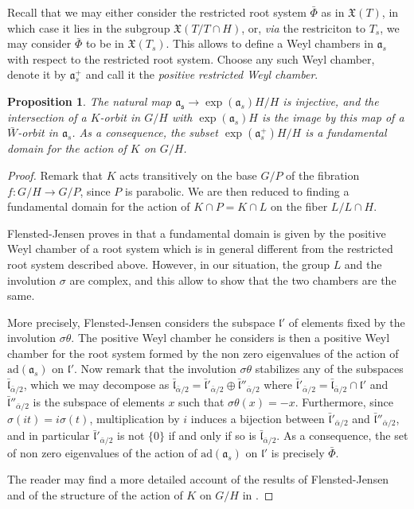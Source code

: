 \documentclass{amsart}
\newtheorem{prop}[thm]{Proposition}
\theoremstyle{definition}
\begin{document}
Recall that we may either consider the restricted root system $\bar{\Phi}$ 
as in $\mathfrak{X}(T)$, in which case it lies in the subgroup 
$\mathfrak{X}(T/T\cap H)$, or, \emph{via} the restriciton to $T_s$, 
we may consider $\bar{\Phi}$ to be in $\mathfrak{X}(T_s)$.
This allows to define a Weyl chambers in $\mathfrak{a}_s$ 
with respect to the restricted root system. Choose any such Weyl 
chamber, denote it by $\mathfrak{a}_s^+$ and call it the 
\emph{positive restricted Weyl chamber}.

\begin{prop}
\label{prop_fundamental_domain}
The natural map $\mathfrak{a_s} \rightarrow \exp(\mathfrak{a}_s)H/H$
is injective, and the intersection of a $K$-orbit 
in $G/H$ with $\exp(\mathfrak{a}_s)H$ is the image by this map of 
a $\bar{W}$-orbit in $\mathfrak{a}_s$. 
As a consequence, the subset $\exp(\mathfrak{a}_s^+)H/H$ is a fundamental 
domain for the action of $K$ on $G/H$. 
\end{prop} 

\begin{proof} 
Remark that $K$ acts transitively on the base 
$G/P$ of the fibration $f:G/H\rightarrow G/P$, since $P$ is parabolic.
We are then reduced to finding a fundamental domain for the 
action of $K\cap P = K \cap L$ on the fiber $L/L\cap H$.

Flensted-Jensen proves in \cite[Section 2]{FJ80} 
that a fundamental domain is given by the positive Weyl chamber 
of a root system which is in general different from the restricted 
root system described above.  
However, in our situation, the group $L$ and the involution $\sigma$ 
are complex, and this allow to show that the two chambers are the same. 

More precisely, Flensted-Jensen considers the subspace $\mathfrak{l}'$ 
of elements fixed by the involution $\sigma \theta$. The positive Weyl chamber 
he considers is then a positive Weyl chamber for the root system formed 
by the non zero eigenvalues of the action of $\mathrm{ad}(\mathfrak{a}_s)$ 
on $\mathfrak{l}'$.
Now remark that the involution $\sigma \theta$ stabilizes any of the 
subspaces $\bar{\mathfrak{l}}_{\bar{\alpha}/2}$, which we may decompose as 
$\bar{\mathfrak{l}}_{\bar{\alpha}/2}=\bar{\mathfrak{l}}'_{\bar{\alpha}/2} 
\oplus \bar{\mathfrak{l}}''_{\bar{\alpha}/2}$ 
where $\bar{\mathfrak{l}}'_{\bar{\alpha}/2} = \bar{\mathfrak{l}}_{\bar{\alpha}/2} \cap \mathfrak{l}'$ 
and $\bar{\mathfrak{l}}''_{\bar{\alpha}/2}$ is the subspace of elements $x$
such that $\sigma \theta (x) = -x$.
Furthermore, since $\sigma(it)=i\sigma(t)$, multiplication by $i$ induces 
a bijection between $\bar{\mathfrak{l}}'_{\bar{\alpha}/2}$ and 
$\bar{\mathfrak{l}}''_{\bar{\alpha}/2}$, and in particular $\bar{\mathfrak{l}}'_{\bar{\alpha}/2}$ 
is not $\{0\}$ if and only if so is $\bar{\mathfrak{l}}_{\bar{\alpha}/2}$. 
As a consequence, the set of non zero eigenvalues of the action of $\mathrm{ad}(\mathfrak{a}_s)$ 
on $\mathfrak{l}'$ is precisely $\bar{\Phi}$. 

The reader may find a more detailed account of the results of 
Flensted-Jensen and of the structure of the action of $K$ on $G/H$
in \cite[Section 3]{vdB05}. 
\end{proof}
\end{document}
